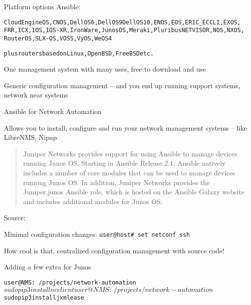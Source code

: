 \documentclass[Screen16to9,17pt]{foils}
\begin{document}


Platform options Ansible:
\begin{alltt}
CloudEngine OS, CNOS, Dell OS6, Dell OS9 Dell OS10, ENOS, EOS, ERIC_ECCLI, EXOS,
FRR, ICX, IOS, IOS-XR, IronWare, Junos OS, Meraki, Pluribus NETVISOR, NOS, NXOS,
RouterOS, SLX-OS, VOSS, VyOS, WeOS 4

plus routers based on Linux, OpenBSD, FreeBSD etc.
\end{alltt}


One management system with many uses, free to download and use
\begin{list2}
\item Generic configuration management -- and you end up running support systems, network near systems
\item Ansible for Network Automation\\
\item Allows you to install, configure and run your network management systems -- like LibreNMS, Nipap
\end{list2}




\begin{quote}
  Juniper Networks provides support for using Ansible to manage devices running Junos OS. Starting in Ansible Release 2.1, Ansible natively includes a number of core modules that can be used to manage devices running Junos OS. In addition, Juniper Networks provides the Juniper.junos Ansible role, which is hosted on the Ansible Galaxy website and includes additional modules for Junos OS.
\end{quote}
Source:{\footnotesize\\
}

\begin{list2}
\item Minimal configuration changes: \verb+user@host# set netconf ssh+
\end{list2}

How cool is that, centralized configuration management with source code!



Adding a few extra for Junos
\begin{alltt}\footnotesize
user@NMS:~/projects/network-automation$ sudo pip3 install ncclient
user@NMS:~/projects/network-automation$ sudo pip3 install jxmlease
\end{alltt}
\end{document}

